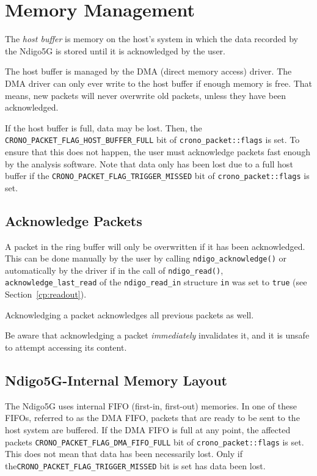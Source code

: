 \section{Memory Management}

The \textit{host buffer} is memory on the host's system in which the data recorded by the Ndigo5G is stored until it is acknowledged by the user.

The host buffer is managed by the DMA (direct memory access) driver. The DMA driver can only ever write to the host buffer if enough memory is free. That means, new packets will never overwrite old packets, unless they have been acknowledged.

If the host buffer is full, data may be lost. Then, the \texttt{CRONO\_PACKET\_FLAG\_HOST\_BUFFER\_FULL} bit of \texttt{crono\_packet::flags} is set. To ensure that this does not happen, the user must acknowledge packets fast enough by the analysis software. Note that data only has been lost due to a full host buffer if the \texttt{CRONO\_PACKET\_FLAG\_TRIGGER\_MISSED} bit of \texttt{crono\_packet::flags} is set.

\subsection{Acknowledge Packets}
A packet in the ring buffer will only be overwritten if it has been acknowledged. This can be done manually by the user by calling \texttt{ndigo\_acknowledge()} or automatically by the driver if in the call of \texttt{ndigo\_read()}, \texttt{acknowledge\_last\_read} of the \texttt{ndigo\_read\_in} structure \texttt{in} was set to \texttt{true} (see Section~\ref{cp:readout}).

Acknowledging a packet acknowledges all previous packets as well.

Be aware that acknowledging a packet \textit{immediately} invalidates it, and it is unsafe to attempt accessing its content.

\subsection{Ndigo5G-Internal Memory Layout}
The Ndigo5G uses internal FIFO (first-in, first-out) memories. In one of these FIFOs, referred to as the DMA FIFO, packets that are ready to be sent to the host system are buffered. If the DMA FIFO is full at any point, the affected packets \texttt{CRONO\_PACKET\_FLAG\_DMA\_FIFO\_FULL} bit of \texttt{crono\_packet::flags} is set. This does not mean that data has been necessarily lost. Only if the\newline\texttt{CRONO\_PACKET\_FLAG\_TRIGGER\_MISSED} bit is set has data been lost.


